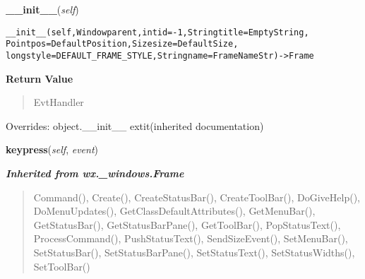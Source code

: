     \vspace{0.5ex}

\hspace{.8\funcindent}\begin{boxedminipage}{\funcwidth}

    \raggedright \textbf{\_\_init\_\_}(\textit{self})

\setlength{\parskip}{2ex}
\begin{alltt}

\_\_init\_\_(self, Window parent, int id=-1, String title=EmptyString, 
    Point pos=DefaultPosition, Size size=DefaultSize, 
    long style=DEFAULT\_FRAME\_STYLE, String name=FrameNameStr) -{\textgreater} Frame
\end{alltt}

\setlength{\parskip}{1ex}
      \textbf{Return Value}
    \vspace{-1ex}

      \begin{quote}
      EvtHandler

      \end{quote}

      Overrides: object.\_\_init\_\_ 	extit{(inherited documentation)}

    \end{boxedminipage}

    \label{lib:screenshot:ScreenshotArea:keypress}

    \vspace{0.5ex}

\hspace{.8\funcindent}\begin{boxedminipage}{\funcwidth}

    \raggedright \textbf{keypress}(\textit{self}, \textit{event})

\setlength{\parskip}{2ex}
\setlength{\parskip}{1ex}
    \end{boxedminipage}


\large{\textbf{\textit{Inherited from wx.\_windows.Frame}}}

\begin{quote}
Command(), Create(), CreateStatusBar(), CreateToolBar(), DoGiveHelp(), DoMenuUpdates(), GetClassDefaultAttributes(), GetMenuBar(), GetStatusBar(), GetStatusBarPane(), GetToolBar(), PopStatusText(), ProcessCommand(), PushStatusText(), SendSizeEvent(), SetMenuBar(), SetStatusBar(), SetStatusBarPane(), SetStatusText(), SetStatusWidths(), SetToolBar()
\end{quote}

